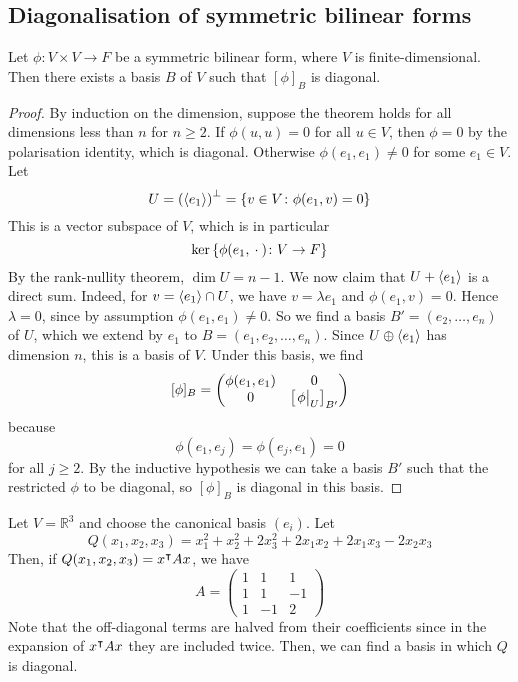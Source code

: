 \subsection{Diagonalisation of symmetric bilinear forms}
\begin{theorem}
	Let \( \phi \colon V \times V \to F \) be a symmetric bilinear form, where \( V \) is finite-dimensional.
	Then there exists a basis \( B \) of \( V \) such that \( [\phi]_B \) is diagonal.
\end{theorem}
\begin{proof}
	By induction on the dimension, suppose the theorem holds for all dimensions less than \( n \) for \( n \geq 2 \).
	If \( \phi(u,u) = 0 \) for all \( u \in V \), then \( \phi = 0 \) by the polarisation identity, which is diagonal.
	Otherwise \( \phi(e_1, e_1) \neq 0 \) for some \( e_1 \in V \).
	Let
	\[
		U = \qty(\langle{} e_1 \rangle)^\perp = \qty{v \in V \colon \phi(e_1, v) = 0}
	\]
	This is a vector subspace of \( V \), which is in particular
	\[
		\ker \qty{ \phi(e_1, {}\cdot{}) \colon V \to F }
	\]
	By the rank-nullity theorem, \( \dim U = n - 1 \).
	We now claim that \( U + \langle{} e_1 \rangle \) is a direct sum.
	Indeed, for \( v = \langle{} e_1 \rangle \cap U \), we have \( v = \lambda e_1 \) and \( \phi(e_1, v) = 0 \).
	Hence \( \lambda = 0 \), since by assumption \( \phi(e_1, e_1) \neq 0 \).
	So we find a basis \( B' = (e_2, \dots, e_n) \) of \( U \), which we extend by \( e_1 \) to \( B = (e_1, e_2, \dots, e_n) \).
	Since \( U \oplus \langle{} e_1 \rangle \) has dimension \( n \), this is a basis of \( V \).
	Under this basis, we find
	\[
		[\phi]_B = \begin{pmatrix}
			\phi(e_1, e_1) & 0                          \\
			0              & \qty[\eval{\phi}_{U}]_{B'}
		\end{pmatrix}
	\]
	because
	\[
		\phi(e_1, e_j) = \phi(e_j, e_1) = 0
	\]
	for all \( j \geq 2 \).
	By the inductive hypothesis we can take a basis \( B' \) such that the restricted \( \phi \) to be diagonal, so \( [\phi]_B \) is diagonal in this basis.
\end{proof}
\begin{example}
	Let \( V = \mathbb R^3 \) and choose the canonical basis \( (e_i) \).
	Let
	\[
		Q(x_1, x_2, x_3) = x_1^2 + x_2^2 + 2x_3^2 + 2x_1 x_2 + 2x_1 x_3 - 2x_2 x_3
	\]
	Then, if \( Q(x_1, x_2, x_3) = x^\intercal A x \), we have
	\[
		A = \begin{pmatrix}
			1 & 1  & 1  \\
			1 & 1  & -1 \\
			1 & -1 & 2
		\end{pmatrix}
	\]
	Note that the off-diagonal terms are halved from their coefficients since in the expansion of \( x^\intercal A x \) they are included twice.
	Then, we can find a basis in which \( Q \) is diagonal.
\end{example}

